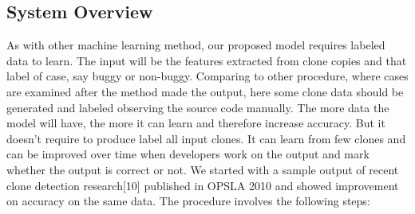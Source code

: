 \documentclass[nocopyrightspace]{sigplanconf}
\begin{document}
\subsection{System Overview}
As with other machine learning method, our proposed model requires labeled data to learn. The input will be the features extracted from clone copies and that label of case, say buggy or non-buggy. Comparing to other procedure, where cases are examined after the method made the output, here some clone data should be generated and labeled observing the source code manually. The more data the model will have, the more it can learn and therefore increase accuracy. But it doesn't require to produce label all input clones. It can learn from few clones and can be improved over time when developers work on the output and mark whether the output is correct or not. We started with a sample output of recent clone detection research[10] published in OPSLA 2010 and showed improvement on accuracy on the same data. The procedure involves the following steps:
\end{document}
